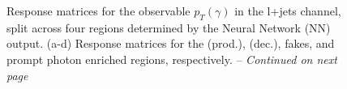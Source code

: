 \FloatBarrier

\begin{figure}[!ht]
  \centering
  \quad\quad
  \quad\quad
  \quad\quad
  \caption[Short caption for LoF]{Response matrices for the observable $p_T(\gamma)$ in the l+jets channel, split across four regions determined by the Neural Network (NN) output. (a-d) Response matrices for the \tty (prod.), \tty (dec.), fakes, and prompt photon enriched regions, respectively. -- \emph{Continued on next page}}
  \label{fig:folding_input_response_ljet_pt1}
\end{figure}
